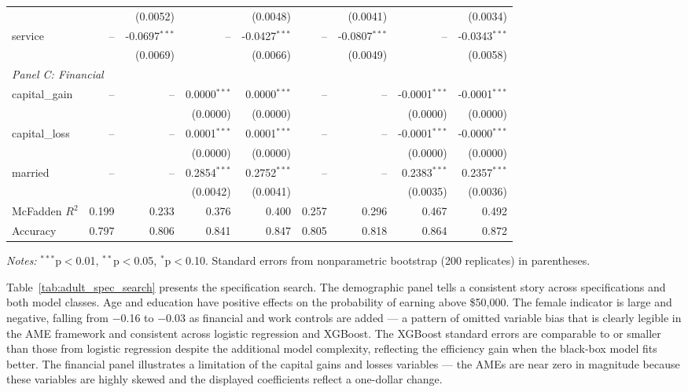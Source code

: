 \documentclass[conference]{IEEEtran}
\begin{document}
\begin{table}[htbp]
{\begin{threeparttable}
\begin{tabular}{lrrrrrrrr}
					&  & (0.0052) &  & (0.0048) &  & (0.0041) &  & (0.0034) \\
					\quad service & -- & -0.0697$^{***}$ & -- & -0.0427$^{***}$ & -- & -0.0807$^{***}$ & -- & -0.0343$^{***}$ \\
					&  & (0.0069) &  & (0.0066) &  & (0.0049) &  & (0.0058) \\
					\midrule
					\multicolumn{9}{l}{\textit{Panel C: Financial}} \\
					\quad capital\_gain & -- & -- & 0.0000$^{***}$ & 0.0000$^{***}$ & -- & -- & -0.0001$^{***}$ & -0.0001$^{***}$ \\
					&  &  & (0.0000) & (0.0000) &  &  & (0.0000) & (0.0000) \\
					\quad capital\_loss & -- & -- & 0.0001$^{***}$ & 0.0001$^{***}$ & -- & -- & -0.0001$^{***}$ & -0.0000$^{***}$ \\
					&  &  & (0.0000) & (0.0000) &  &  & (0.0000) & (0.0000) \\
					\quad married & -- & -- & 0.2854$^{***}$ & 0.2752$^{***}$ & -- & -- & 0.2383$^{***}$ & 0.2357$^{***}$ \\
					&  &  & (0.0042) & (0.0041) &  &  & (0.0035) & (0.0036) \\
					\midrule
					McFadden $R^2$ & 0.199 & 0.233 & 0.376 & 0.400 & 0.257 & 0.296 & 0.467 & 0.492 \\
					Accuracy & 0.797 & 0.806 & 0.841 & 0.847 & 0.805 & 0.818 & 0.864 & 0.872 \\
					\bottomrule
				\end{tabular}
				\begin{tablenotes}
					\footnotesize
					\item \textit{Notes:} $^{***}$p$<$0.01, $^{**}$p$<$0.05, $^{*}$p$<$0.10. Standard errors from nonparametric bootstrap (200 replicates) in parentheses.
				\end{tablenotes}
			\end{threeparttable}
		}%
	\end{table}
	
	Table~\ref{tab:adult_spec_search} presents the specification search. The demographic panel tells a consistent story across specifications and both model classes. Age and education have positive effects on the probability of earning above \$50,000. The female indicator is large and negative, falling from $-$0.16 to $-$0.03 as financial and work controls are added --- a pattern of omitted variable bias that is clearly legible in the AME framework and consistent across logistic regression and XGBoost. The XGBoost standard errors are comparable to or smaller than those from logistic regression despite the additional model complexity, reflecting the efficiency gain when the black-box model fits better. The financial panel illustrates a limitation of the capital gains and losses variables --- the AMEs are near zero in magnitude because these variables are highly skewed and the displayed coefficients reflect a one-dollar change.
	
\end{document}
